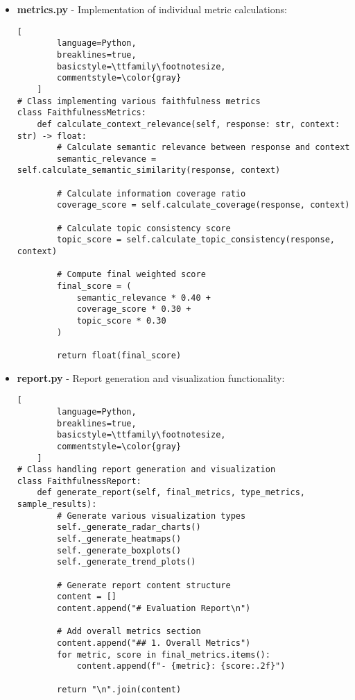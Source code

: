 \begin{itemize}
    \vspace{0.5em}
    \item \textbf{metrics.py} - Implementation of individual metric calculations:
    \begin{lstlisting}[
        language=Python,
        breaklines=true,
        basicstyle=\ttfamily\footnotesize,
        commentstyle=\color{gray}
    ]
# Class implementing various faithfulness metrics
class FaithfulnessMetrics:
    def calculate_context_relevance(self, response: str, context: str) -> float:
        # Calculate semantic relevance between response and context
        semantic_relevance = self.calculate_semantic_similarity(response, context)
        
        # Calculate information coverage ratio
        coverage_score = self.calculate_coverage(response, context)
        
        # Calculate topic consistency score
        topic_score = self.calculate_topic_consistency(response, context)
        
        # Compute final weighted score
        final_score = (
            semantic_relevance * 0.40 +
            coverage_score * 0.30 +
            topic_score * 0.30
        )
        
        return float(final_score)
    \end{lstlisting}

    \vspace{0.5em}
    \item \textbf{report.py} - Report generation and visualization functionality:
    \begin{lstlisting}[
        language=Python,
        breaklines=true,
        basicstyle=\ttfamily\footnotesize,
        commentstyle=\color{gray}
    ]
# Class handling report generation and visualization
class FaithfulnessReport:
    def generate_report(self, final_metrics, type_metrics, sample_results):
        # Generate various visualization types
        self._generate_radar_charts()
        self._generate_heatmaps()
        self._generate_boxplots()
        self._generate_trend_plots()
        
        # Generate report content structure
        content = []
        content.append("# Evaluation Report\n")
        
        # Add overall metrics section
        content.append("## 1. Overall Metrics")
        for metric, score in final_metrics.items():
            content.append(f"- {metric}: {score:.2f}")
        
        return "\n".join(content)
    \end{lstlisting}
\end{itemize}

